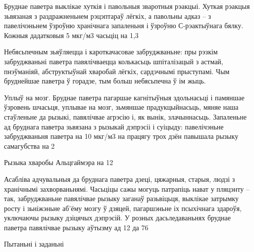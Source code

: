 Бруднае паветра выклікае хуткія і павольныя зваротныя рэакцыі. Хуткая рэакцыя зьвязаная з раздражненьнем рэцэптараў лёгкіх, а павольны адказ – з павелічэньнем ўзроўню хранічнага запаленьня і ўзроўню С-рэактыўнага бялку. Кожныя дадатковыя 5 мкг/м3 часьціц на 1,3%

Небясьпечным зьяўляецца і кароткачасовае забруджваньне: пры рэзкім забруджваньні паветра павялічваецца колькасьць шпіталізацый з астмай, пнэўманіяй, абструктыўнай хваробай лёгкіх, сардэчнымі прыступамі. Чым бруднейшае паветра ў горадзе, тым больш небясьпечна ў ім жыць.

Уплыў на мозг. Бруднае паветра пагаршае кагнітыўныя здольнасьці і памяншае ўзровень шчасьця, уплывае на мозг, зьмяншае прадукцыйнасьць, мяняе наша стаўленьне да рызыкі, павялічвае агрэсію і, як вынік, злачыннасьць. Запаленьне ад бруднага паветра зьвязана з рызыкай дэпрэсіі і суіцыду: павелічэньне забруджваньня паветра на 10 мкг/м3 на працягу трох дзён павышала рызыку самагубства на 2%

Рызыка хваробы Альцгаймэра на 12%

Асабліва адчувальныя да бруднага паветра дзеці, цяжарныя, старыя, людзі з хранічнымі захворваньнямі. Часьціцы сажы могуць патрапіць нават у пляцэнту – так, забруджваньне павялічвае рызыку заганаў разьвіцьця, выклікае затрымку росту і зьніжэньне аб'ёму мозгу ў дзяцей, пагаршэньне іх псыхічнага здароўя, уключаючы рызыку дзіцячых дэпрэсій. У розных дасьледаваньнях бруднае паветра павялічвае рызыку аўтызму ад 12 да 76%

Пытаньні і заданьні

